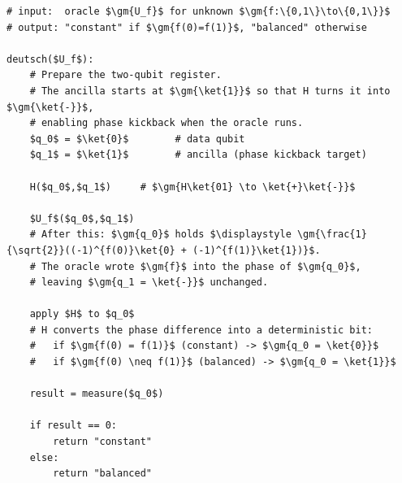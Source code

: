 \documentclass[oneside]{academica}
\begin{document}
\begin{lstlisting}
# input:  oracle $\gm{U_f}$ for unknown $\gm{f:\{0,1\}\to\{0,1\}}$
# output: "constant" if $\gm{f(0)=f(1)}$, "balanced" otherwise

deutsch($U_f$):
    # Prepare the two-qubit register.
    # The ancilla starts at $\gm{\ket{1}}$ so that H turns it into $\gm{\ket{-}}$,
    # enabling phase kickback when the oracle runs.
    $q_0$ = $\ket{0}$        # data qubit
    $q_1$ = $\ket{1}$        # ancilla (phase kickback target)

    H($q_0$,$q_1$)     # $\gm{H\ket{01} \to \ket{+}\ket{-}}$

    $U_f$($q_0$,$q_1$)
    # After this: $\gm{q_0}$ holds $\displaystyle \gm{\frac{1}{\sqrt{2}}((-1)^{f(0)}\ket{0} + (-1)^{f(1)}\ket{1})}$.
    # The oracle wrote $\gm{f}$ into the phase of $\gm{q_0}$,
    # leaving $\gm{q_1 = \ket{-}}$ unchanged.

    apply $H$ to $q_0$
    # H converts the phase difference into a deterministic bit:
    #   if $\gm{f(0) = f(1)}$ (constant) -> $\gm{q_0 = \ket{0}}$
    #   if $\gm{f(0) \neq f(1)}$ (balanced) -> $\gm{q_0 = \ket{1}}$

    result = measure($q_0$)

    if result == 0:
        return "constant"
    else:
        return "balanced"
\end{lstlisting}
\end{document}
